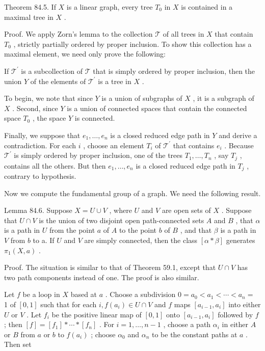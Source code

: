 \documentclass[10pt]{article}
\begin{document}
Theorem 84.5. If \(X\) is a linear graph, every tree \({T}_{0}\) in \(X\) is contained in a maximal tree in \(X\) .

Proof. We apply Zorn’s lemma to the collection \(\mathcal{T}\) of all trees in \(X\) that contain \({T}_{0}\) , strictly partially ordered by proper inclusion. To show this collection has a maximal element, we need only prove the following:

If \({\mathcal{T}}^{\prime }\) is a subcollection of \(\mathcal{T}\) that is simply ordered by proper inclusion, then the union \(Y\) of the elements of \({\mathcal{T}}^{\prime }\) is a tree in \(X\) .

To begin, we note that since \(Y\) is a union of subgraphs of \(X\) , it is a subgraph of \(X\) . Second, since \(Y\) is a union of connected spaces that contain the connected space \({T}_{0}\) , the space \(Y\) is connected.

Finally, we suppose that \({e}_{1},\ldots ,{e}_{n}\) is a closed reduced edge path in \(Y\) and derive a contradiction. For each \(i\) , choose an element \({T}_{i}\) of \({\mathcal{T}}^{\prime }\) that contains \({e}_{i}\) . Because \({\mathcal{T}}^{\prime }\) is simply ordered by proper inclusion, one of the trees \({T}_{1},\ldots ,{T}_{n}\) , say \({T}_{j}\) , contains all the others. But then \({e}_{1},\ldots ,{e}_{n}\) is a closed reduced edge path in \({T}_{j}\) , contrary to hypothesis.

Now we compute the fundamental group of a graph. We need the following result.

Lemma 84.6. Suppose \(X = U \cup  V\) , where \(U\) and \(V\) are open sets of \(X\) . Suppose that \(U \cap  V\) is the union of two disjoint open path-connected sets \(A\) and \(B\) , that \(\alpha\) is a path in \(U\) from the point \(a\) of \(A\) to the point \(b\) of \(B\) , and that \(\beta\) is a path in \(V\) from \(b\) to a. If \(U\) and \(V\) are simply connected, then the class \(\left\lbrack  {\alpha  * \beta }\right\rbrack\) generates \({\pi }_{1}\left( {X,a}\right)\) .

Proof. The situation is similar to that of Theorem 59.1, except that \(U \cap  V\) has two path components instead of one. The proof is also similar.

Let \(f\) be a loop in \(X\) based at \(a\) . Choose a subdivision \(0 = {a}_{0} < {a}_{1} < \cdots  < {a}_{n} =\) 1 of \(\left\lbrack  {0,1}\right\rbrack\) such that for each \(i,f\left( {a}_{i}\right)  \in  U \cap  V\) and \(f\) maps \(\left\lbrack  {{a}_{i - 1},{a}_{i}}\right\rbrack\) into either \(U\) or \(V\) . Let \({f}_{i}\) be the positive linear map of \(\left\lbrack  {0,1}\right\rbrack\) onto \(\left\lbrack  {{a}_{i - 1},{a}_{i}}\right\rbrack\) followed by \(f\) ; then \(\left\lbrack  f\right\rbrack   = \left\lbrack  {f}_{1}\right\rbrack   * \cdots  * \left\lbrack  {f}_{n}\right\rbrack\) . For \(i = 1,\ldots ,n - 1\) , choose a path \({\alpha }_{i}\) in either \(A\) or \(B\) from \(a\) or \(b\) to \(f\left( {a}_{i}\right)\) ; choose \({\alpha }_{0}\) and \({\alpha }_{n}\) to be the constant paths at \(a\) . Then set
\end{document}
